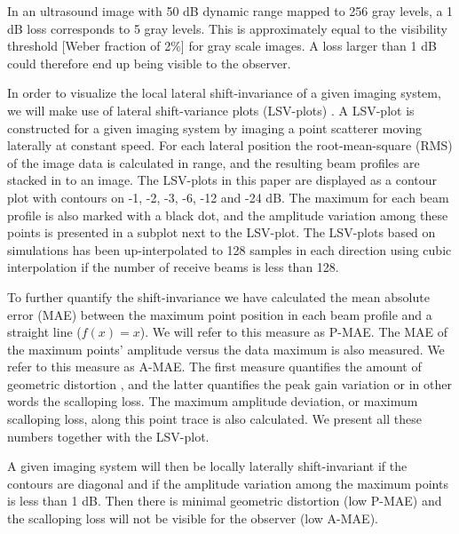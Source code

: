 \documentclass[draftcls]{IEEEtran}
\begin{document}
In an ultrasound image with 50 dB dynamic range mapped to 256 gray levels, a 1 dB loss corresponds to 5 gray levels. This is approximately equal to the visibility threshold [Weber fraction of 2\%] for gray scale images. A loss larger than 1 dB could therefore end up being visible to the observer. %



In order to visualize the local lateral shift-invariance of a given imaging system, we will make use of lateral shift-variance plots (LSV-plots) \cite{Hergum2007}. A LSV-plot is constructed for a given imaging system by imaging a point scatterer moving laterally at constant speed. For each lateral position the root-mean-square (RMS) of the image data is calculated in range, and the resulting beam profiles are stacked in to an image. %
The LSV-plots in this paper are displayed as a contour plot with contours on -1, -2, -3, -6, -12 and -24 dB. The maximum for each beam profile is also marked with a black dot, and the amplitude variation among these points is presented in a subplot next to the LSV-plot. The LSV-plots based on simulations has been up-interpolated to 128 samples in each direction using cubic interpolation if the number of receive beams is less than 128.

To further quantify the shift-invariance we have calculated the mean absolute error (MAE) between the maximum point position in each beam profile and a straight line ($f(x)=x$). We will refer to this measure as P-MAE. The MAE of the maximum points' amplitude versus the data maximum is also measured. We refer to this measure as A-MAE. The first measure quantifies the amount of geometric distortion \cite{Hergum2007}, and the latter quantifies the peak gain variation or in other words the scalloping loss. The maximum amplitude deviation, or maximum scalloping loss, along this point trace is also calculated. We present all these numbers together with the LSV-plot.

A given imaging system will then be locally laterally shift-invariant if the contours are diagonal and if the amplitude variation among the maximum points is less than 1 dB. Then there is minimal geometric distortion (low P-MAE) and the scalloping loss will not be visible for the observer (low A-MAE). %
\end{document}
